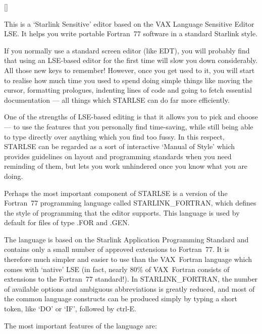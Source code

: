 \vspace{-10mm}

\hfill []

\vspace{2mm}

This is a `Starlink Sensitive' editor based on the \mbox{VAX} Language
Sensitive Editor \mbox{LSE}.
It helps you write portable Fortran~77 software in a standard Starlink style.

If you normally use a standard screen editor (like EDT), you will probably find
that using an \mbox{LSE}-based editor for the first time will slow you down
considerably.
All those new keys to remember!
However, once you get used to it, you will start to realise how much time
you used to spend doing simple things like moving the cursor, formatting
prologues, indenting lines of code and going to fetch essential
documentation --- all things which \mbox{STARLSE} can do far more
efficiently.

One of the strengths of \mbox{LSE}-based editing is that it allows
you to pick and choose --- to use the features that you personally find
time-saving, while still being able to type directly over anything which you
find too fussy.
In this respect, \mbox{STARLSE} can be regarded as a sort of interactive
`Manual of Style' which provides guidelines on layout and programming
standards when you need reminding of them, but lets you work unhindered once
you know what you are doing.

Perhaps the most important component of \mbox{STARLSE} is a version of the
Fortran~77 programming language called \mbox{STARLINK\_FORTRAN}, which
defines the style of programming that the editor supports.
This language is used by default for files of type \mbox{.FOR} and
\mbox{.GEN}.

The language is based on the Starlink Application Programming Standard and
contains only a small number of approved extensions to Fortran~77.
It is therefore much simpler and easier to use than the \mbox{VAX}~Fortran
language which comes with `native' \mbox{LSE} (in fact, nearly 80\% of
\mbox{VAX}~Fortran consists of extensions to the Fortran~77 standard!).
In \mbox{STARLINK\_FORTRAN}, the number of available options and ambiguous
abbreviations is greatly reduced, and most of the common language constructs
can be produced simply by typing a short token, like `DO' or `IF', followed
by \mbox{ctrl-E}.

The most important features of the language are:


